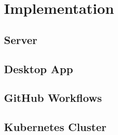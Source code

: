 
\section{Implementation}

\subsection{Server}

\subsection{Desktop App}

\subsection{GitHub Workflows}

\subsection{Kubernetes Cluster}

